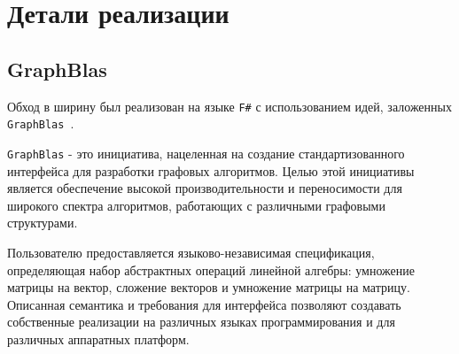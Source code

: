 
\section{Детали реализации}
\subsection{GraphBlas}
Обход в ширину был реализован на языке \texttt{F\#} с использованием идей, заложенных \texttt{GraphBlas}~\cite{graphBlas}.

\texttt{GraphBlas} - это инициатива, нацеленная на создание стандартизованного интерфейса для разработки графовых алгоритмов. Целью этой инициативы является обеспечение высокой производительности и переносимости для широкого спектра алгоритмов, работающих с различными графовыми структурами.

Пользователю предоставляется языково-независимая спецификация, определяющая набор абстрактных операций линейной алгебры: умножение матрицы на вектор, сложение векторов и умножение матрицы на матрицу. Описанная семантика и требования для интерфейса позволяют создавать собственные реализации на различных языках программирования и для различных аппаратных платформ. 

